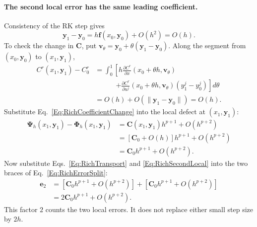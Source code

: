 \paragraph{The second local error has the same leading coefficient.}
Consistency of the RK step gives
\begin{equation}\label{Eq:RichNearbyStart}
 \mathbf y_1-\mathbf y_0=h\mathbf f(x_0,\mathbf y_0)+O(h^2)=O(h).
\end{equation}
To check the change in $\mathbf C$, put
$\mathbf v_\theta=\mathbf y_0+\theta(\mathbf y_1-\mathbf y_0)$.
Along the segment from $(x_0,\mathbf y_0)$ to $(x_1,\mathbf y_1)$,
\begin{align}
 C^r(x_1,\mathbf y_1)-C_0^r
 &=\int_0^1\left[
 h\frac{\partial C^r}{\partial x}(x_0+\theta h,\mathbf v_\theta)
 \right.\nonumber\\[-2pt]
 &\hspace{3em}\left.
 +\frac{\partial C^r}{\partial u^j}(x_0+\theta h,\mathbf v_\theta)
       (y_1^j-y_0^j)\right]d\theta\nonumber\\
 &=O(h)+O(\|\mathbf y_1-\mathbf y_0\|)=O(h).
 \label{Eq:RichCoefficientChange}
\end{align}
Substitute Eq.~\ref{Eq:RichCoefficientChange} into the local defect at
$(x_1,\mathbf y_1)$:
\begin{align}
 \boldsymbol\Psi_h(x_1,\mathbf y_1)-\boldsymbol\Phi_h(x_1,\mathbf y_1)
 &=\mathbf C(x_1,\mathbf y_1)h^{p+1}+O(h^{p+2})\nonumber\\
 &=[\mathbf C_0+O(h)]h^{p+1}+O(h^{p+2})\nonumber\\
 &=\mathbf C_0h^{p+1}+O(h^{p+2}).\label{Eq:RichSecondLocal}
\end{align}
Now substitute Eqs.~\ref{Eq:RichTransport} and \ref{Eq:RichSecondLocal}
into the two braces of Eq.~\ref{Eq:RichErrorSplit}:
\begin{equation}\label{Eq:RichTwoStepError}
\begin{aligned}
 \mathbf e_2
 &=[\mathbf C_0h^{p+1}+O(h^{p+2})]
   +[\mathbf C_0h^{p+1}+O(h^{p+2})]\\
 &=2\mathbf C_0h^{p+1}+O(h^{p+2}).
\end{aligned}
\end{equation}
This factor $2$ counts the two local errors. It does not replace either
small step size by $2h$.

